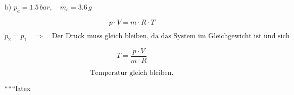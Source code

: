 b) $p_a = 1.5 \, bar, \quad m_c = 3.6 \, g$

\[
p \cdot V = m \cdot R \cdot T
\]

\[
p_2 = p_1 \quad \Rightarrow \quad \text{Der Druck muss gleich bleiben, da das System im Gleichgewicht ist und sich weder das Gewicht des Kolbens noch der Luftdruck verändert.}
\]

\[
T = \frac{p \cdot V}{m \cdot R}
\]

\[
\text{Temperatur gleich bleiben.}
\]

``````latex